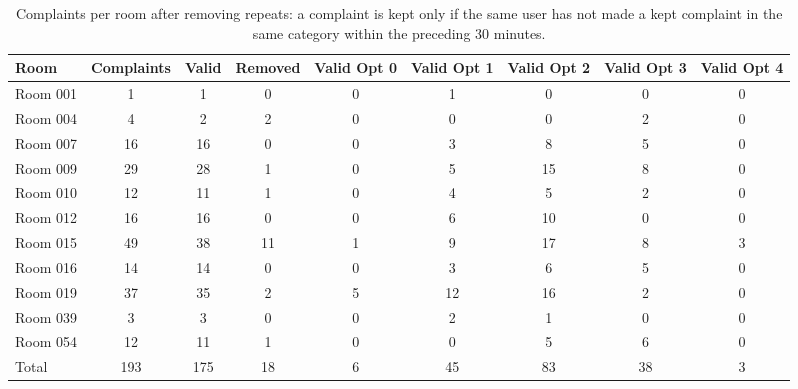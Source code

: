 \begin{table}[ht]
\centering
\begin{adjustbox}{max width=\textwidth}
\begin{tabular}{lcccccccc}
\hline
Room & Complaints & Valid & Removed & Valid Opt 0 & Valid Opt 1 & Valid Opt 2 & Valid Opt 3 & Valid Opt 4 \\
\hline
Room 001 & 1 & 1 & 0 & 0 & 1 & 0 & 0 & 0 \\
Room 004 & 4 & 2 & 2 & 0 & 0 & 0 & 2 & 0 \\
Room 007 & 16 & 16 & 0 & 0 & 3 & 8 & 5 & 0 \\
Room 009 & 29 & 28 & 1 & 0 & 5 & 15 & 8 & 0 \\
Room 010 & 12 & 11 & 1 & 0 & 4 & 5 & 2 & 0 \\
Room 012 & 16 & 16 & 0 & 0 & 6 & 10 & 0 & 0 \\
Room 015 & 49 & 38 & 11 & 1 & 9 & 17 & 8 & 3 \\
Room 016 & 14 & 14 & 0 & 0 & 3 & 6 & 5 & 0 \\
Room 019 & 37 & 35 & 2 & 5 & 12 & 16 & 2 & 0 \\
Room 039 & 3 & 3 & 0 & 0 & 2 & 1 & 0 & 0 \\
Room 054 & 12 & 11 & 1 & 0 & 0 & 5 & 6 & 0 \\
Total & 193 & 175 & 18 & 6 & 45 & 83 & 38 & 3 \\
\hline
\end{tabular}
\end{adjustbox}
\caption{Complaints per room after removing repeats: a complaint is kept only if the same user has not made a kept complaint in the same category within the preceding 30 minutes.}
\label{tab:valid_feedback_counts}
\end{table}
